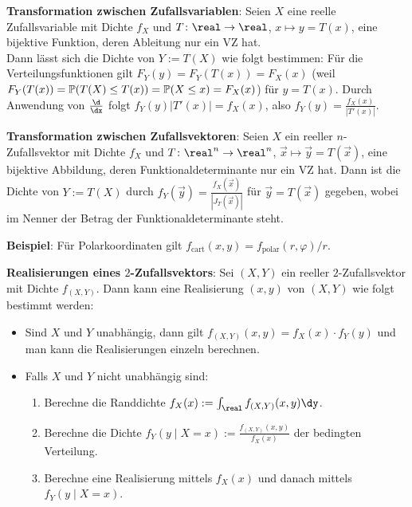 \linie

\textbf{Transformation zwischen Zufallsvariablen}:
Seien $X$ eine reelle Zufallsvariable mit Dichte $f_X$ und
$T\colon \real \to \real$, $x \mapsto y = T(x)$, eine bijektive
Funktion, deren Ableitung nur ein VZ hat.\\
Dann lässt sich die Dichte von $Y := T(X)$ wie folgt bestimmen:
Für die Verteilungsfunktionen gilt $F_Y(y) = F_Y(T(x)) = F_X(x)$
(weil $F_Y(T(x)) = \mathbb{P}(T(X) \le T(x)) = \mathbb{P}(X \le x) = F_X(x)$) für $y = T(x)$.
Durch Anwendung von $\frac{\d}{\dx}$ folgt $f_Y(y) |T'(x)| = f_X(x)$,
also $f_Y(y) = \frac{f_X(x)}{|T'(x)|}$.

\textbf{Transformation zwischen Zufallsvektoren}:
Seien $X$ ein reeller $n$-Zufallsvektor mit Dichte $f_X$ und
$T\colon \real^n \to \real^n$, $\vec{x} \mapsto \vec{y} = T(\vec{x})$, eine bijektive
Abbildung, deren Funktionaldeterminante nur ein VZ hat.
Dann ist die Dichte von $Y := T(X)$ durch $f_Y(\vec{y}) = \frac{f_X(\vec{x})}{|J_T(\vec{x})|}$
für $\vec{y} = T(\vec{x})$ gegeben, wobei im Nenner der Betrag der Funktionaldeterminante steht.

\textbf{Beispiel}:
Für Polarkoordinaten gilt
$f_{\text{cart}}(x, y) = f_{\text{polar}}(r, \varphi) / r$.

\linie

\textbf{Realisierungen eines $2$-Zufallsvektors}:
Sei $(X, Y)$ ein reeller $2$-Zufallsvektor mit Dichte $f_{(X,Y)}$.
Dann kann eine Realisierung $(x, y)$ von $(X, Y)$ wie folgt bestimmt werden:
\begin{itemize}
    \item
    Sind $X$ und $Y$ unabhängig, dann gilt $f_{(X,Y)}(x, y) = f_X(x) \cdot f_Y(y)$
    und man kann die Realisierungen einzeln berechnen.
    
    \item
    Falls $X$ und $Y$ nicht unabhängig sind:
    \begin{enumerate}
        \item
        Berechne die Randdichte $f_X(x) := \int_\real f_{(X,Y)}(x, y) \dy$.
        
        \item
        Berechne die Dichte $f_Y(y\;|\;X=x) := \frac{f_{(X,Y)}(x, y)}{f_X(x)}$
        der bedingten Verteilung.
        
        \item
        Berechne eine Realisierung mittels $f_X(x)$ und danach mittels $f_Y(y\;|\;X=x)$.
    \end{enumerate}
\end{itemize}

